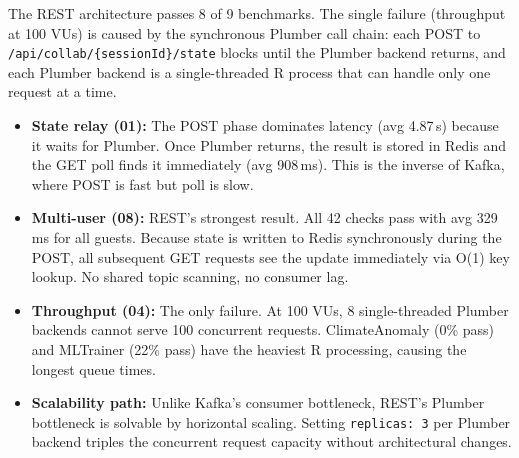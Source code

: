 \documentclass[11pt,a4paper]{article}
\begin{document}
The REST architecture passes 8 of 9 benchmarks. The single failure
(throughput at 100 VUs) is caused by the synchronous Plumber call chain:
each POST to \texttt{/api/collab/\{sessionId\}/state} blocks until the
Plumber backend returns, and each Plumber backend is a single-threaded
R process that can handle only one request at a time.

\begin{itemize}
  \item \textbf{State relay (01):} The POST phase dominates latency
        (avg 4.87\,s) because it waits for Plumber. Once Plumber returns,
        the result is stored in Redis and the GET poll finds it
        immediately (avg 908\,ms). This is the inverse of Kafka, where
        POST is fast but poll is slow.
  \item \textbf{Multi-user (08):} REST's strongest result. All 42 checks
        pass with avg 329\,ms for all guests. Because state is written
        to Redis synchronously during the POST, all subsequent GET
        requests see the update immediately via O(1) key lookup.
        No shared topic scanning, no consumer lag.
  \item \textbf{Throughput (04):} The only failure. At 100 VUs,
        8 single-threaded Plumber backends cannot serve 100 concurrent
        requests. ClimateAnomaly (0\% pass) and MLTrainer (22\% pass)
        have the heaviest R processing, causing the longest queue times.
  \item \textbf{Scalability path:} Unlike Kafka's consumer bottleneck,
        REST's Plumber bottleneck is solvable by horizontal scaling.
        Setting \texttt{replicas: 3} per Plumber backend triples the
        concurrent request capacity without architectural changes.
\end{itemize}
\end{document}
